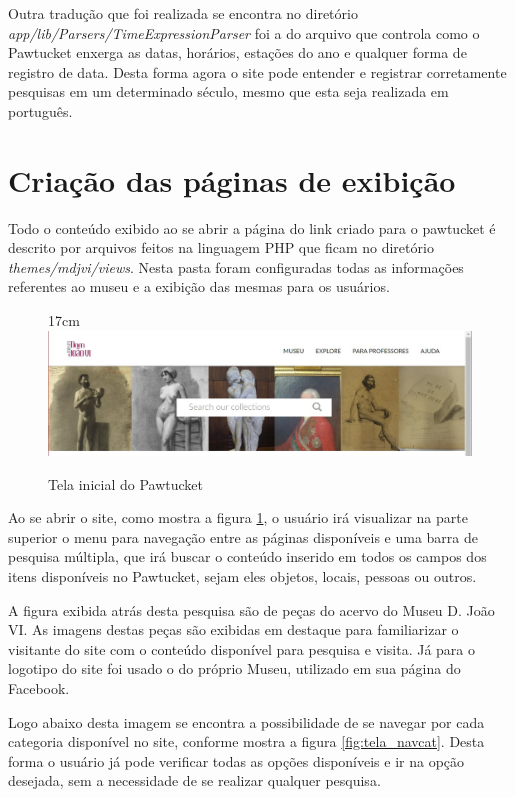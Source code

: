 \documentclass[a4paper,12pt,oneside,onecolumn,final,fleqn]{repUERJ}
\begin{document}
Outra tradução que foi realizada se encontra no diretório \textit{app/lib/Parsers/TimeExpressionParser} foi a do arquivo que controla como o Pawtucket enxerga as datas, horários, estações do ano e qualquer forma de registro de data. Desta forma agora o site pode entender e registrar corretamente pesquisas em um determinado século, mesmo que esta seja realizada em português.

\section{Criação das páginas de exibição}

Todo o conteúdo exibido ao se abrir a página do link criado para o pawtucket é descrito por arquivos feitos na linguagem PHP que ficam no diretório \textit{themes/mdjvi/views}. Nesta pasta foram configuradas todas as informações referentes ao museu e a exibição das mesmas para os usuários.

\begin{figure}[!ht]{17cm}
	\includegraphics[width=15cm, center]{figuras/pawtucket_telainicial.jpg}
	\caption{Tela inicial do Pawtucket} \label{fig:tela_inic}
\end{figure}

Ao se abrir o site, como mostra a figura \ref{fig:tela_inic}, o usuário irá visualizar na parte superior o menu para navegação entre as páginas disponíveis e uma barra de pesquisa múltipla, que irá buscar o conteúdo inserido em todos os campos dos itens disponíveis no Pawtucket, sejam eles objetos, locais, pessoas ou outros.

A figura exibida atrás desta pesquisa são de peças do acervo do Museu D. João VI. As imagens destas peças são exibidas em destaque para familiarizar o visitante do site com o conteúdo disponível para pesquisa e visita. Já para o logotipo do site foi usado o do próprio Museu, utilizado em sua página do Facebook.

Logo abaixo desta imagem se encontra a possibilidade de se navegar por cada categoria disponível no site, conforme mostra a figura \ref{fig:tela_navcat}. Desta forma o usuário já pode verificar todas as opções disponíveis e ir na opção desejada, sem a necessidade de se realizar qualquer pesquisa.
\end{document}
